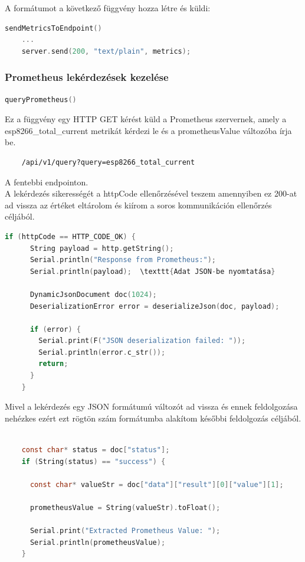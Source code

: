 A formátumot a következő függvény hozza létre és küldi:

\begin{lstlisting}[language=C]
    sendMetricsToEndpoint()
    ...
    server.send(200, "text/plain", metrics);
\end{lstlisting}

\subsubsection{Prometheus lekérdezések kezelése}

\begin{lstlisting}[language=C]
    queryPrometheus()
\end{lstlisting}

Ez a függvény egy HTTP GET kérést küld a Prometheus szervernek, amely a esp8266\_total\_current 
metrikát kérdezi le és a prometheusValue változóba írja be.

\begin{lstlisting}
    /api/v1/query?query=esp8266_total_current
\end{lstlisting}

A fentebbi endpointon. \\
A lekérdezés sikerességét a httpCode ellenőrzésével teszem amennyiben ez 200-at ad vissza az értéket eltárolom 
és kiírom a soros kommunikáción ellenőrzés céljából.

\begin{lstlisting}[language=C]
    if (httpCode == HTTP_CODE_OK) {
      String payload = http.getString();
      Serial.println("Response from Prometheus:");
      Serial.println(payload);  \texttt{Adat JSON-be nyomtatása}

      DynamicJsonDocument doc(1024);
      DeserializationError error = deserializeJson(doc, payload);

      if (error) {
        Serial.print(F("JSON deserialization failed: "));
        Serial.println(error.c_str());
        return;
      }
    }
\end{lstlisting}

Mivel a lekérdezés egy JSON formátumú változót ad vissza és ennek feldolgozása nehézkes ezért ezt rögtön szám 
formátumba alakítom későbbi feldolgozás céljából.

\begin{lstlisting}[language=C]
    
    const char* status = doc["status"];
    if (String(status) == "success") {
      
      const char* valueStr = doc["data"]["result"][0]["value"][1];
      
      prometheusValue = String(valueStr).toFloat();

      Serial.print("Extracted Prometheus Value: ");
      Serial.println(prometheusValue);
    }
\end{lstlisting}

